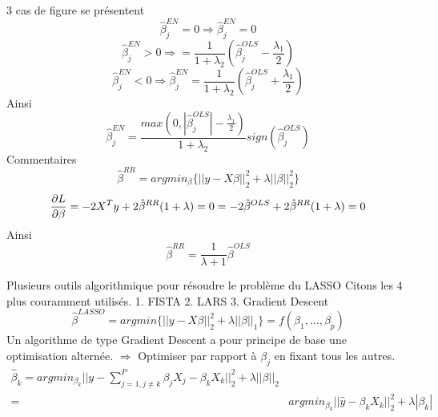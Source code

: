 \documentclass{article}
\begin{document}
3 cas de figure se pr\'esentent
\begin{equation}
\hat{\beta}_j^{EN} = 0 \Rightarrow \hat{\beta}_j^{EN}=0
\end{equation}
\begin{equation}
\hat{\beta}_j^{EN}>0\Rightarrow=\frac{1}{1+\lambda_2}(\hat{\beta}_j^{OLS}-\frac{\lambda_1}{2})
\end{equation}
\begin{equation}
\hat{\beta}_j^{EN}<0\Rightarrow \hat{\beta}_j^{EN}=\frac{1}{1+\lambda_2}(\hat{\beta}_j^{OLS}+\frac{\lambda_1}{2})
\end{equation}
Ainsi
\begin{equation}
\hat{\beta}_j^{EN}=\frac{max(0,|\hat{\beta}_j^{OLS}|-\frac{\lambda_1}{2})}{1+\lambda_2} sign(\hat{\beta}_j^{OLS})
\end{equation}
Commentaires
\begin{equation}
\hat{\beta}^{RR}=argmin_\beta\{||y-X\beta||_2^2+\lambda||\beta||_2^2\}
\end{equation}
\begin{equation}
\frac{\partial L}{\partial \beta}=-2X^Ty+2\hat{\beta}^{RR}(1+\lambda)=0\\
=-2\hat{\beta}^{OLS}+2\hat{\beta}^{RR}(1+\lambda)=0
\end{equation}
Ainsi
\begin{equation}
\hat{\beta}^{RR}=\frac{1}{\lambda+1}\hat{\beta}^{OLS}
\end{equation}

Plusieurs outils algorithmique pour r\'esoudre le probl\`eme du LASSO Citons les 4 plus couramment utilis\'es.
1. FISTA
2. LARS
3. Gradient Descent
\begin{equation}
\hat{\beta}^{LASSO}=argmin \{||y-X\beta||_2^2+\lambda||\beta||_1\}=f(\beta_1,\ldots,\beta_p)
\end{equation}
Un algorithme de type Gradient Descent a pour principe de base une optimisation altern\'ee.
$\Rightarrow$ Optimiser par rapport \`a $\beta_j$ en fixant tous les autres.
\begin{equation}
\begin{split}
\hat{\beta}_k=argmin_{\beta_k}||y-\sum_{j=1,j\neq k}^P\beta_j X_j-\beta_kX_k||_2^2+\lambda||\beta||_2\\
=&argmin_{\beta_k}||\hat{y}-\beta_kX_k||_2^2+\lambda|\beta_k|
\end{split}
\end{equation}
\end{document}
